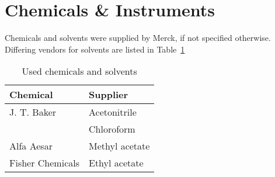 
\section{Chemicals \& Instruments} %
\label{sec:chemicals_&_instruments}

	Chemicals and solvents were supplied by Merck, if not specified otherwise. Differing vendors for solvents are listed in Table~\ref{tab:solvent_table}

	\begin{table}[htbp]
		\caption{Used chemicals and solvents}
		\label{tab:solvent_table}
		\centering
		\begin{tabularx}{\textwidth}{XX}
			\toprule
			\textbf{Chemical}	&	\textbf{Supplier}	\\
			\midrule
			J. T. Baker			&	Acetonitrile		\\
								&	Chloroform			\\
			Alfa Aesar			&	Methyl acetate		\\
			Fisher Chemicals 	&	Ethyl acetate		\\
		\end{tabularx}
	\end{table}




